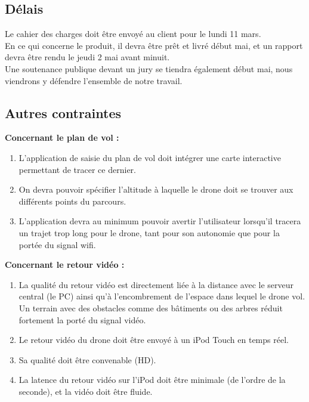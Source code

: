 \documentclass{article}
\begin{document}
	\subsection{Délais}
		Le cahier des charges doit être envoyé au client pour le lundi 11 mars.\\
		En ce qui concerne le produit, il devra être prêt et livré début mai, et un rapport devra être rendu le jeudi 2 mai avant minuit.\\
		Une soutenance publique devant un jury se tiendra également début mai, nous viendrons y défendre l'ensemble de notre travail.\\
		
	\subsection{Autres contraintes}
	    \begin{flushleft}
	    \textbf{Concernant le plan de vol :} 
	    \end{flushleft}
	    	\begin{enumerate}
            	\item  L'application de saisie du plan de vol doit intégrer une carte interactive permettant de tracer ce dernier.
    		 	\item On devra pouvoir spécifier l'altitude à laquelle le drone doit se trouver aux différents points du parcours.
    		 	\item L'application devra au minimum pouvoir avertir l'utilisateur lorsqu'il tracera un trajet trop long pour le drone, tant pour son autonomie que pour la portée du signal wifi.
		 	\end{enumerate}
		
	    \begin{flushleft}
	    \textbf{Concernant le retour vidéo :}
	    \end{flushleft}
	     	\begin{enumerate}
	     	\item La qualité du retour vidéo est directement liée à la distance avec le serveur central (le PC) ainsi qu'à l'encombrement de l'espace dans lequel le drone vol. Un terrain avec des obstacles comme des bâtiments ou des arbres réduit fortement la porté du signal vidéo.
	     	\item Le retour vidéo du drone doit être envoyé à un iPod Touch en temps réel.
	     	\item Sa qualité doit être convenable (HD).
		 	\item La latence du retour vidéo sur l'iPod doit être minimale (de l'ordre de la seconde), et la vidéo doit être fluide.
		 	\end{enumerate}
\end{document}
